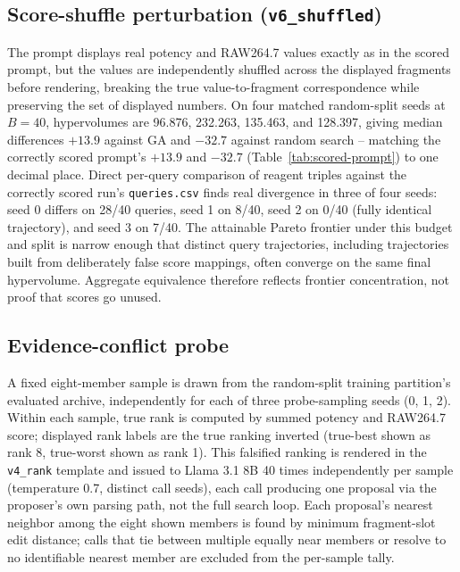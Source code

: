\subsection{Score-shuffle perturbation (\texttt{v6\_shuffled})}
\label{app:shuffle}
The prompt displays real potency and RAW264.7 values exactly as in the scored prompt, but the values are independently shuffled across the displayed fragments before rendering, breaking the true value-to-fragment correspondence while preserving the set of displayed numbers. On four matched random-split seeds at $B=40$, hypervolumes are 96.876, 232.263, 135.463, and 128.397, giving median differences $+13.9$ against GA and $-32.7$ against random search -- matching the correctly scored prompt's $+13.9$ and $-32.7$ (Table~\ref{tab:scored-prompt}) to one decimal place. Direct per-query comparison of reagent triples against the correctly scored run's \texttt{queries.csv} finds real divergence in three of four seeds: seed 0 differs on 28/40 queries, seed 1 on 8/40, seed 2 on 0/40 (fully identical trajectory), and seed 3 on 7/40. The attainable Pareto frontier under this budget and split is narrow enough that distinct query trajectories, including trajectories built from deliberately false score mappings, often converge on the same final hypervolume. Aggregate equivalence therefore reflects frontier concentration, not proof that scores go unused.

\subsection{Evidence-conflict probe}
\label{app:conflict}
A fixed eight-member sample is drawn from the random-split training partition's evaluated archive, independently for each of three probe-sampling seeds (0, 1, 2). Within each sample, true rank is computed by summed potency and RAW264.7 score; displayed rank labels are the true ranking inverted (true-best shown as rank 8, true-worst shown as rank 1). This falsified ranking is rendered in the \texttt{v4\_rank} template and issued to Llama 3.1 8B 40 times independently per sample (temperature 0.7, distinct call seeds), each call producing one proposal via the proposer's own parsing path, not the full search loop. Each proposal's nearest neighbor among the eight shown members is found by minimum fragment-slot edit distance; calls that tie between multiple equally near members or resolve to no identifiable nearest member are excluded from the per-sample tally.

